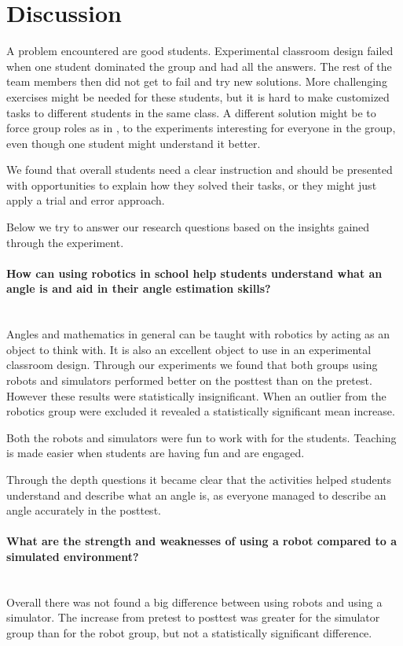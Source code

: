 \section{Discussion}
A problem encountered are good students. Experimental classroom design failed when one student dominated the group and had all the answers. The rest of the team members then did not get to fail and try new solutions. More challenging exercises might be needed for these students, but it is hard to make customized tasks to different students in the same class. A different solution might be to force group roles as in \cite{mitnik2009collaborative}, to the experiments interesting for everyone in the group, even though one student might understand it better.

\bigskip\noindent
We found that overall students need a clear instruction and should be presented with opportunities to explain how they solved their tasks, or they might just apply a trial and error approach. 

\bigskip\noindent
Below we try to answer our research questions based on the insights gained through the experiment. 

\paragraph{How can using robotics in school help students understand what an angle is and aid in their angle estimation skills?}~\\
Angles and mathematics in general can be taught with robotics by acting as an object to think with. It is also an excellent object to use in an experimental classroom design. Through our experiments we found that both groups using robots and simulators performed better on the posttest than on the pretest. However these results were statistically insignificant. When an outlier from the robotics group were excluded it revealed a statistically significant mean increase. 

Both the robots and simulators were fun to work with for the students. Teaching is made easier when students are having fun and are engaged.

\bigskip\noindent
Through the depth questions it became clear that the activities helped students understand and describe what an angle is, as everyone managed to describe an angle accurately in the posttest. 

\paragraph{What are the strength and weaknesses of using a robot compared to a simulated environment?}~\\
Overall there was not found a big difference between using robots and using a simulator.
The increase from pretest to posttest was greater for the simulator group than for the robot group, but not a statistically significant difference. 

